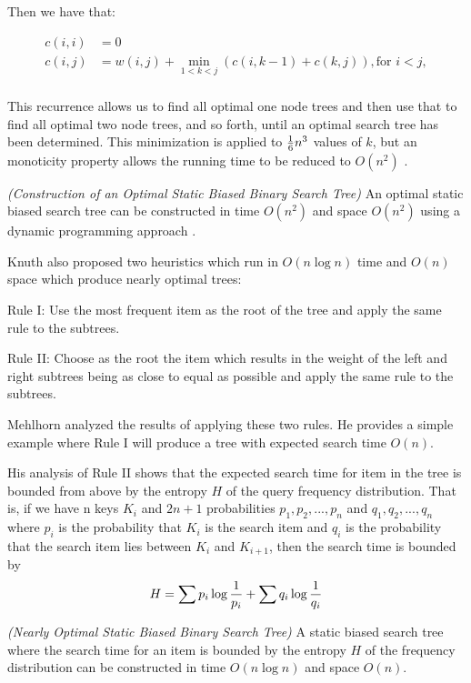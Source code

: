 \documentclass[mcs]{scsthesis}
\begin{document}
Then we have that:

\begin{equation}
    \begin{aligned}
    c(i, i) & = 0 \\
    c(i, j) & = w(i, j) + \min_{1<k<j} (c(i, k - 1) + c(k, j)), \text{for } i<j, \\
    \end{aligned}
\end{equation}

This recurrence allows us to find all optimal one node trees and then use that
to find all optimal two node trees, and so forth, until an optimal search
tree has been determined. This minimization is applied to \({1\over{6}} n^{3} \)
values of \( k \), but an monoticity property allows the running time
to be reduced to \( O(n^2) \) \cite{knuth}.

\begin{thm} \emph{(Construction of an Optimal Static Biased Binary Search Tree)} 
An optimal static biased search tree can be constructed in time \(O(n^2)\) and
space \(O(n^2)\) using a dynamic programming approach \cite{knuth}.
\end{thm}

Knuth also proposed two heuristics which run in \(O(n \log n)\) time and
\(O(n)\) space which produce nearly optimal trees:

Rule I: Use the most frequent item as the root of the tree and apply the same
rule to the subtrees.

Rule II: Choose as the root the item which results in the weight of the left
and right subtrees being as close to equal as possible and apply the same
rule to the subtrees. 

Mehlhorn \cite{mehlhorn} analyzed the results of applying these two rules. He
provides a simple example where Rule I will produce a tree with expected
search time \(O(n)\).

His analysis of Rule II shows that the expected search time for item in the tree
is bounded from above by the entropy \(H\) of the query frequency distribution.
That is, if we have n keys \(K_i\) and \(2n + 1\) probabilities
\(p_1, p_2, ..., p_n\) and \(q_1, q_2, ..., q_n\) where \(p_i\) is the
probability that \(K_i\) is the search item and \(q_i\) is the
probability that the search item lies between \(K_i\) and \(K_{i+1}\), then
the search time is bounded by
$$
H = \sum{ p_i \log{1 \over p_i}} + \sum{ q_i \log{1 \over q_i}}
$$

\begin{thm} \emph{(Nearly Optimal Static Biased Binary Search Tree)} 
A static biased search tree where the search time for an item is bounded by
the entropy \(H\) of the frequency distribution can be constructed in time
\(O(n \log n)\) and space \(O(n)\).
\end{thm}
\end{document}
